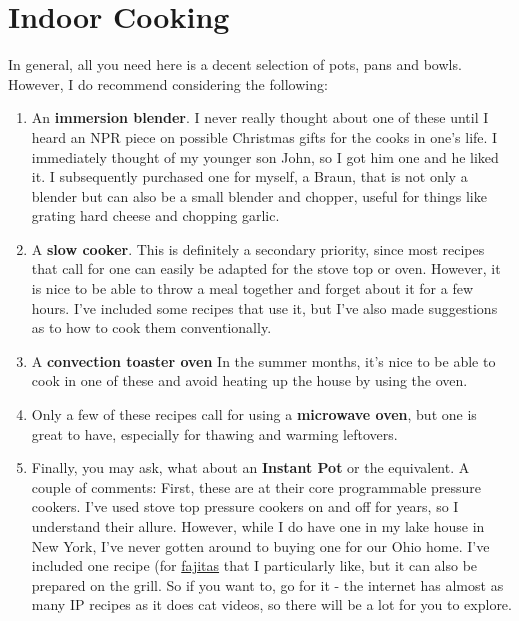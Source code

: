 \documentclass[
]{book}
\providecommand{\tightlist}{%
  \setlength{\itemsep}{0pt}\setlength{\parskip}{0pt}}
\begin{document}
\hypertarget{indoor-cooking}{%
\section{Indoor Cooking}\label{indoor-cooking}}

In general, all you need here is a decent selection of pots, pans and bowls. However, I do recommend considering the following:

\begin{enumerate}
\def\labelenumi{\arabic{enumi}.}
\tightlist
\item
  An \textbf{immersion blender}. I never really thought about one of these until I heard an NPR piece on possible Christmas gifts for the cooks in one's life. I immediately thought of my younger son John, so I got him one and he liked it. I subsequently purchased one for myself, a Braun, that is not only a blender but can also be a small blender and chopper, useful for things like grating hard cheese and chopping garlic.
\item
  A \textbf{slow cooker}. This is definitely a secondary priority, since most recipes that call for one can easily be adapted for the stove top or oven. However, it is nice to be able to throw a meal together and forget about it for a few hours. I've included some recipes that use it, but I've also made suggestions as to how to cook them conventionally.
\item
  A \textbf{convection toaster oven} In the summer months, it's nice to be able to cook in one of these and avoid heating up the house by using the oven.\\
\item
  Only a few of these recipes call for using a \textbf{microwave oven}, but one is great to have, especially for thawing and warming leftovers.\\
\item
  Finally, you may ask, what about an \textbf{Instant Pot} or the equivalent. A couple of comments: First, these are at their core programmable pressure cookers. I've used stove top pressure cookers on and off for years, so I understand their allure. However, while I do have one in my lake house in New York, I've never gotten around to buying one for our Ohio home. I've included one recipe (for \protect\hyperlink{fajitas}{fajitas} that I particularly like, but it can also be prepared on the grill. So if you want to, go for it - the internet has almost as many IP recipes as it does cat videos, so there will be a lot for you to explore.
\end{enumerate}
\end{document}

